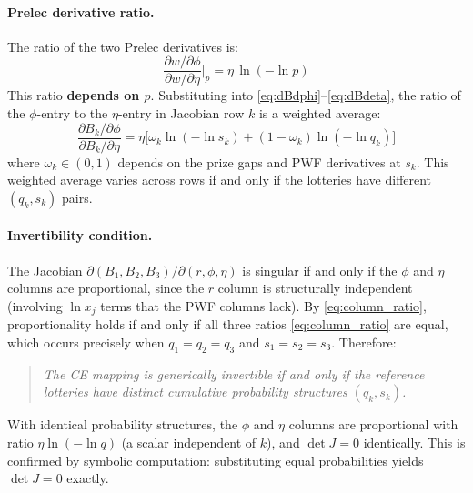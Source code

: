 \documentclass[11pt,a4paper]{article}
\theoremstyle{definition}
\begin{document}
\paragraph{Prelec derivative ratio.} The ratio of the two Prelec derivatives is:
\begin{equation}
    \label{eq:prelec_ratio}
    \frac{\partial w / \partial \phi}{\partial w / \partial \eta}\bigg|_p
    = \eta \, \ln(-\ln p)
\end{equation}
This ratio \textbf{depends on $p$}. Substituting into
\eqref{eq:dBdphi}--\eqref{eq:dBdeta}, the ratio of the $\phi$-entry to the
$\eta$-entry in Jacobian row $k$ is a weighted average:
\begin{equation}
    \label{eq:column_ratio}
    \frac{\partial B_k / \partial \phi}{\partial B_k / \partial \eta}
    = \eta \Big[ \omega_k \ln(-\ln s_k) + (1 - \omega_k) \ln(-\ln q_k) \Big]
\end{equation}
where $\omega_k \in (0,1)$ depends on the prize gaps and PWF derivatives at
$s_k$. This weighted average varies across rows if and only if the lotteries
have different $(q_k, s_k)$ pairs.

\paragraph{Invertibility condition.} The Jacobian
$\partial(B_1, B_2, B_3) / \partial(r, \phi, \eta)$ is singular if and only if
the $\phi$ and $\eta$ columns are proportional, since the $r$ column is
structurally independent (involving $\ln x_j$ terms that the PWF columns lack).
By \eqref{eq:column_ratio}, proportionality holds if and only if all three
ratios \eqref{eq:column_ratio} are equal, which occurs precisely when
$q_1 = q_2 = q_3$ and $s_1 = s_2 = s_3$. Therefore:
\begin{quote}
    \emph{The CE mapping is generically invertible if and only if the reference
    lotteries have distinct cumulative probability structures $(q_k, s_k)$.}
\end{quote}
With identical probability structures, the $\phi$ and $\eta$ columns are
proportional with ratio $\eta \ln(-\ln q)$ (a scalar independent of $k$), and
$\det J = 0$ identically. This is confirmed by symbolic computation:
substituting equal probabilities yields $\det J = 0$ exactly.
\end{document}
